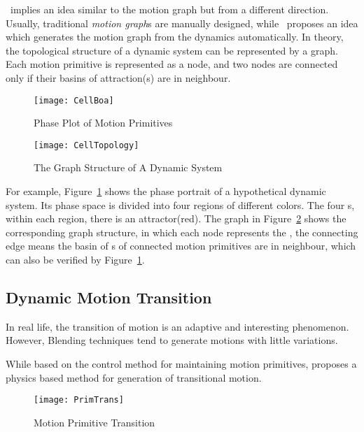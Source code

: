 \moit\ implies an idea similar to the motion graph but from a different direction.
Usually, traditional \emph{motion graph}s are manually designed, while \moit\ proposes an idea which generates the motion graph from the dynamics automatically.
In theory, the topological structure of a dynamic system can be represented by a  graph.
Each motion primitive is represented as a node, and two nodes are connected only if their basins of attraction({\boa}s) are in neighbour.

\begin{figure}[!htbp]
  \begin{center}
	\texttt{[image: CellBoa]}
    \caption{Phase Plot of Motion Primitives}
    \label{fig:manyprimitives}
  \end{center}
\end{figure}


\begin{figure}[!htbp]
  \begin{center}
      \texttt{[image: CellTopology]}
    \caption{The Graph Structure of A Dynamic System}
    \label{fig:manyprimitivesgraph}
  \end{center}
\end{figure}

For example, Figure~\ref{fig:manyprimitives} shows the phase portrait of a hypothetical dynamic system.
Its phase space is divided into four regions of different colors.
The four \boa s, within each region, there is an attractor(red).
The graph in Figure~\ref{fig:manyprimitivesgraph} shows the corresponding graph structure, in which each node represents the \boa, the connecting edge means the basin of {\boa}s of connected motion primitives are in neighbour, which can also be verified by Figure~\ref{fig:manyprimitives}.


\subsection{Dynamic Motion Transition}

In real life, the transition of motion is an adaptive and interesting phenomenon.
However, Blending techniques tend to generate motions with little variations. 

While based on the control method for maintaining motion primitives, \moit proposes a physics based method for generation of transitional motion.



\begin{figure}[!htbp]
  \begin{center}
      \texttt{[image: PrimTrans]}
    \caption{Motion Primitive Transition}
    \label{fig:motion-transition}
  \end{center}
\end{figure}

